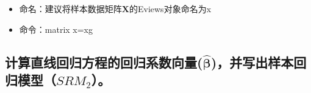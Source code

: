 \documentclass[12pt,(landscape,a4paper),(portrait,a4paper)]{article}
\providecommand{\tightlist}{%
  \setlength{\itemsep}{0pt}\setlength{\parskip}{0pt}}
\begin{document}
\begin{itemize}
  \begin{itemize}
  \tightlist
  \item
    命名：建议将样本数据矩阵\(\mathbf{X}\)的Eviews对象命名为x
  \item
    命令：matrix x=xg
  \end{itemize}
\end{itemize}

\hypertarget{mathbfhatbetasrm_2}{%
\subsection{\texorpdfstring{计算直线回归方程的回归系数向量(\(\mathbf{\hat{\beta}}\))，并写出样本回归模型（\(SRM_2\)）。}{计算直线回归方程的回归系数向量(\textbackslash{}mathbf\{\textbackslash{}hat\{\textbackslash{}beta\}\})，并写出样本回归模型（SRM\_2）。}}\label{mathbfhatbetasrm_2}}
\end{document}
